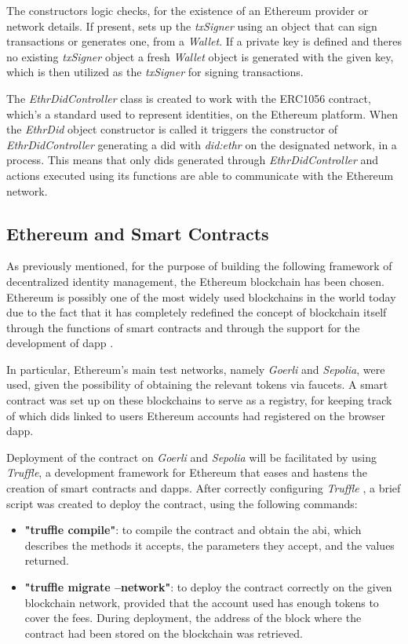 The constructors logic checks, for the existence of an Ethereum provider or network details. If present, sets up the \textit{txSigner} using an object that can sign transactions or 
generates one, from a \textit{Wallet}. If a private key is defined and theres no existing \textit{txSigner} object a fresh \textit{Wallet} object is generated with the given key, which is then 
utilized as the \textit{txSigner} for signing transactions.

The \textit{EthrDidController} class is created to work with the ERC1056 contract, which's a standard used to represent identities, on the Ethereum platform. When the \textit{EthrDid} 
object constructor is called it triggers the constructor of \textit{EthrDidController} generating a \gls{did} with \textit{did:ethr} on the designated network, in a process. This means that only 
\gls{did}s generated through \textit{EthrDidController} and actions executed using its functions are able to communicate with the Ethereum network.

\subsection{Ethereum and Smart Contracts}

As previously mentioned, for the purpose of building the following framework of decentralized identity management, the Ethereum blockchain has been chosen. Ethereum is 
possibly one of the most widely used blockchains in the world today due to the fact that it has completely redefined the concept of blockchain itself through the functions 
of smart contracts and through the support for the development of \gls{dapp} \cite{ethereum}.

In particular, Ethereum's main test networks, namely \textit{Goerli} and \textit{Sepolia}, were used, given the possibility of obtaining the relevant tokens via faucets. A smart contract was 
set up on these blockchains to serve as a registry, for keeping track of which \gls{did}s linked to users Ethereum accounts had registered on the browser \gls{dapp}. 

Deployment of the contract on \textit{Goerli} and \textit{Sepolia} will be facilitated by using \textit{Truffle}, a development framework for Ethereum that eases and hastens the creation of smart 
contracts and \gls{dapp}s. After correctly configuring \textit{Truffle} \cite{truffle-suite}, a brief script was created to deploy the contract, using the following commands: 

\begin{itemize}
  \item \textbf{"truffle compile"}: to compile the contract and obtain the \gls{abi}, which describes the methods it accepts, the parameters they accept, and the values returned.
  \item \textbf{"truffle migrate --network"}: to deploy the contract correctly on the given blockchain network, provided that the account used has enough tokens to cover 
  the fees. During deployment, the address of the block where the contract had been stored on the blockchain was retrieved.
\end{itemize}

